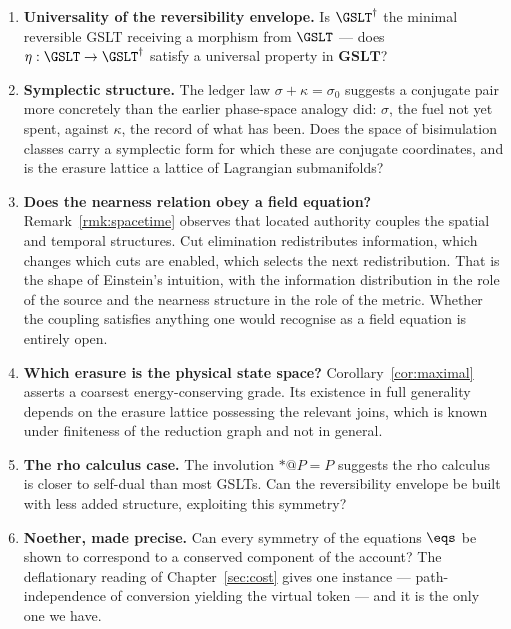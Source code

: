 \begin{enumerate}[itemsep=4pt]
  \item \textbf{Universality of the reversibility envelope.}  Is
        $\GSLT^\dagger$ the minimal reversible GSLT receiving a morphism
        from $\GSLT$ --- does $\eta : \GSLT \to \GSLT^\dagger$ satisfy a
        universal property in $\mathbf{GSLT}$?

  \item \textbf{Symplectic structure.}  The ledger law
        $\sigma + \kappa = \sigma_0$ suggests a conjugate pair more
        concretely than the earlier phase-space analogy did: $\sigma$, the
        fuel not yet spent, against $\kappa$, the record of what has been.
        Does the space of bisimulation classes carry a symplectic form for
        which these are conjugate coordinates, and is the erasure lattice
        a lattice of Lagrangian submanifolds?

  \item \textbf{Does the nearness relation obey a field equation?}
        Remark~\ref{rmk:spacetime} observes that located authority couples
        the spatial and temporal structures.  Cut elimination redistributes
        information, which changes which cuts are enabled, which selects
        the next redistribution.  That is the shape of Einstein's
        intuition, with the information distribution in the role of the
        source and the nearness structure in the role of the metric.
        Whether the coupling satisfies anything one would recognise as a
        field equation is entirely open.

  \item \textbf{Which erasure is the physical state space?}
        Corollary~\ref{cor:maximal} asserts a coarsest energy-conserving
        grade.  Its existence in full generality depends on the erasure
        lattice possessing the relevant joins, which is known under
        finiteness of the reduction graph and not in general.

  \item \textbf{The rho calculus case.}  The involution ${*}{@}P = P$
        suggests the rho calculus is closer to self-dual than most GSLTs.
        Can the reversibility envelope be built with less added structure,
        exploiting this symmetry?

  \item \textbf{Noether, made precise.}  Can every symmetry of the
        equations $\eqs$ be shown to correspond to a conserved component
        of the account?  The deflationary reading of
        Chapter~\ref{sec:cost} gives one instance --- path-independence of
        conversion yielding the virtual token --- and it is the only one
        we have.
\end{enumerate}


